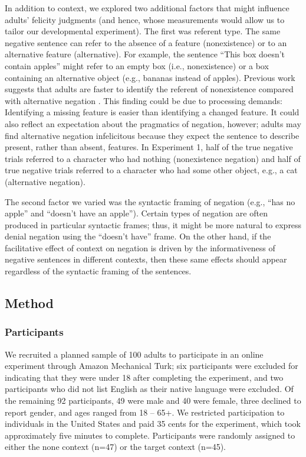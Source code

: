 \documentclass[man, noapacite]{apa2}
\begin{document}
In addition to context, we explored two additional factors that might influence adults' felicity judgments (and hence, whose measurements would allow us to tailor our developmental experiment). The first was referent type. The same negative sentence can refer to the absence of a feature (nonexistence) or to an alternative feature (alternative). For example, the sentence ``This box doesn't contain apples'' might refer to an empty box (i.e., nonexistence) or a box containing an alternative object (e.g., bananas instead of apples). Previous work suggests that adults are faster to identify the referent of nonexistence compared with alternative negation \cite{nordmeyer2013, nordmeyer2014b}. This finding could be due to processing demands: Identifying a missing feature is easier than identifying a changed feature. It could also reflect an expectation about the pragmatics of negation, however; adults may find alternative negation infelicitous because they expect the sentence to describe present, rather than absent, features. In Experiment 1, half of the true negative trials referred to a character who had nothing (nonexistence negation) and half of true negative trials referred to a character who had some other object, e.g., a cat (alternative negation).

The second factor we varied was the syntactic framing of negation (e.g., ``has no apple'' and ``doesn't have an apple''). Certain types of negation are often produced in particular syntactic frames; thus, it might be more natural to express denial negation using the ``doesn't have'' frame. On the other hand, if the facilitative effect of context on negation is driven by the informativeness of negative sentences in different contexts, then these same effects should appear regardless of the syntactic framing of the sentences.

\subsection{Method}

\subsubsection{Participants}

We recruited a planned sample of 100 adults to participate in an online experiment through Amazon Mechanical Turk; six participants were excluded for indicating that they were under 18 after completing the experiment, and two participants who did not list English as their native language were excluded. Of the remaining 92 participants, 49 were male and 40 were female, three declined to report gender, and ages ranged from 18 -- 65+. We restricted participation to individuals in the United States and paid 35 cents for the experiment, which took approximately five minutes to complete. Participants were randomly assigned to either the none context (n=47) or the target context (n=45).
\end{document}
